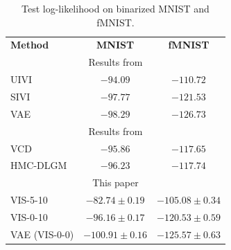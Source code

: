 \begin{table}[!ht]
\centering
\caption{Test log-likelihood on binarized MNIST and fMNIST. }\label{tbl:vae}
\begin{tabular}{lcc}
\cline{1-3}
\textbf{Method}   & \textbf{MNIST}                             & \textbf{fMNIST}   \\ \cline{1-3}
 \multicolumn{3}{c}{\small Results from \cite{pmlr-v89-titsias19a}}       \\
    UIVI          & $-94.09$ &  $-110.72$ \\
    SIVI          & $-97.77$ &  $-121.53$ \\
    VAE          & $-98.29$ &  $-126.73$ \\
    \cline{1-3}
 \multicolumn{3}{c}{\small Results from \cite{pmlr-v97-ruiz19a}}       \\
    VCD          & $-95.86$ &  $-117.65$ \\
    HMC-DLGM & $-96.23$ & $-117.74$ \\ 
    \cline{1-3}
    \multicolumn{3}{c}{\small This paper}       \\
    VIS-5-10     & $\bm{-82.74 \pm 0.19}$ & $\bm{-105.08 \pm 0.34}$  \\
    VIS-0-10     & $-96.16 \pm 0.17$ & $-120.53 \pm 0.59$  \\
    VAE (VIS-0-0)              & $-100.91 \pm 0.16$ & $-125.57 \pm 0.63$ \\
\end{tabular}
\end{table}
